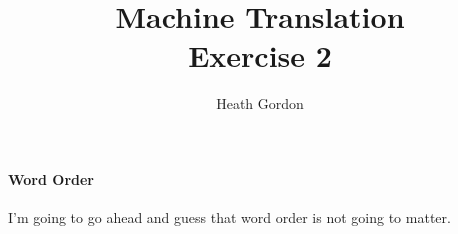 \documentclass[a4paper, 10pt]{article}
\title{Machine Translation\\
Exercise 2}
\author{Heath Gordon}
\begin{document}
\maketitle

\paragraph{Word Order} I'm going to go ahead and guess that word order
is not going to matter.
\end{document}
